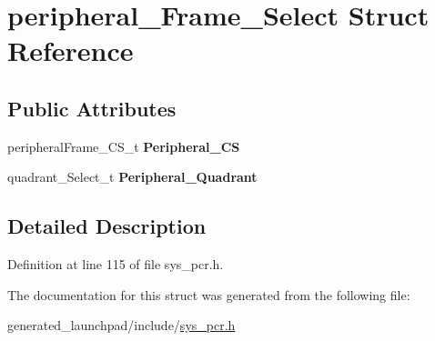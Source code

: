 \hypertarget{structperipheral__Frame__Select}{}\section{peripheral\+\_\+\+Frame\+\_\+\+Select Struct Reference}
\label{structperipheral__Frame__Select}
\subsection*{Public Attributes}
\begin{DoxyCompactItemize}
\item 
\mbox{\label{structperipheral__Frame__Select_a0ca74bee7eb11beef46463df17df0e44}} 
peripheral\+Frame\+\_\+\+C\+S\+\_\+t {\bfseries Peripheral\+\_\+\+CS}
\item 
\mbox{\label{structperipheral__Frame__Select_a0b9fc9ad1ec79cef4de3106c98a63c01}} 
quadrant\+\_\+\+Select\+\_\+t {\bfseries Peripheral\+\_\+\+Quadrant}
\end{DoxyCompactItemize}


\subsection{Detailed Description}


Definition at line 115 of file sys\+\_\+pcr.\+h.



The documentation for this struct was generated from the following file\+:\begin{DoxyCompactItemize}
\item 
generated\+\_\+launchpad/include/\mbox{\hyperlink{sys__pcr_8h}{sys\+\_\+pcr.\+h}}\end{DoxyCompactItemize}
